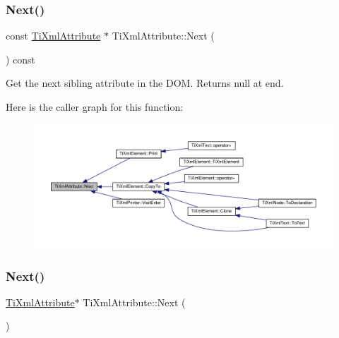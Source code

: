 \subsubsection{\texorpdfstring{Next()}{Next()}\hspace{0.1cm}{\footnotesize\ttfamily [1/2]}}
{\footnotesize\ttfamily const \hyperlink{class_ti_xml_attribute}{Ti\+Xml\+Attribute} $\ast$ Ti\+Xml\+Attribute\+::\+Next (\begin{DoxyParamCaption}{ }\end{DoxyParamCaption}) const}



Get the next sibling attribute in the D\+OM. Returns null at end. 

Here is the caller graph for this function\+:
\nopagebreak
\begin{figure}[H]
\begin{center}
\leavevmode
\includegraphics[width=350pt]{class_ti_xml_attribute_af2e78f1ba9ed56a26ddc80614ed1c393_icgraph}
\end{center}
\end{figure}
\mbox{\label{class_ti_xml_attribute_a138320aa7793b148ba7e5bd0a0ea4db6}} 
\subsubsection{\texorpdfstring{Next()}{Next()}\hspace{0.1cm}{\footnotesize\ttfamily [2/2]}}
{\footnotesize\ttfamily \hyperlink{class_ti_xml_attribute}{Ti\+Xml\+Attribute}$\ast$ Ti\+Xml\+Attribute\+::\+Next (\begin{DoxyParamCaption}{ }\end{DoxyParamCaption})\hspace{0.3cm}{\ttfamily [inline]}}

\mbox{\label{class_ti_xml_attribute_a80dcb758cc5ab27ce9865301e2da1335}} 
